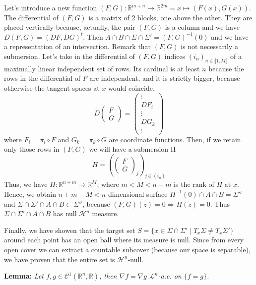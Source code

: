 \documentclass{article}
\begin{document}
\vspace{1ex}
Let's introduce a new function $(F, G):\mathbb R^{m+n}\rightarrow\mathbb R^{2m}
=x\mapsto (F(x),G(x))$. The differential of $(F,G)$ is a matrix of 2 blocks, one
above the other. They are placed vertically because, actually, the pair $(F,G)$ is
a column and we have $D(F,G)=(DF,DG)^t$. Then $A\cap B\cap\Sigma\cap\Sigma'=(F,G)
^{-1}(0)$ and we have a representation of an intersection. Remark
that $(F, G)$ is not necessarily a submersion. Let's take in the differential of $(F
,G)$ indices $(i_n)_{n\in\llbracket1,M\rrbracket}$ of a maximally linear
independent set of rows. Its cardinal is at least $n$ because the rows in the
differential of $F$ are independent, and it is strictly bigger, because otherwise
the tangent spaces at $x$ would coincide.
\[D\left(\begin{array}{cc} F\\ G\end{array}\right) =
    \left(\begin{array}{cc} \vdots \\DF_i\\ \vdots\\ DG_k\\ \vdots\end{array}\right)\]
where $F_i=\pi_i\circ F$ and $G_k=\pi_k\circ G$ are coordinate functions. Then,
if we retain only those rows in $(F,G)$ we will have a submersion H
\[H=\left(\left(\begin{array}{cc} F\\ G\end{array}\right)_j\right)_{j\in(i_n)}\]
Thus, we have $H:\mathbb R^{n+m}\rightarrow\mathbb R^{M}$, where $m<M<n+m$ is the
rank of $H$ at $x$. Hence, we obtain $n+m-M<n$ dimensional surface $H^{-1}(0)\cap
A\cap B=\Sigma''$ and $\Sigma\cap\Sigma'\cap A\cap B\subset\Sigma''$, because
$(F,G)(z)=0\Rightarrow H(z)=0$. Thus $\Sigma\cap\Sigma'\cap A\cap B$ has null
$\mathcal H^n$ measure.

\vspace{1ex}
Finally, we have showen that the target set $S=\{x\in\Sigma\cap\Sigma'\;|\;T_x\Sigma
\neq T_x\Sigma'\}$ around each point has an open ball where its measure is null.
Since from every open cover we can extract a countable subcover (because our
space is separable), we have proven that the entire set is $\mathcal H^n$-null.

\vspace{2ex}
\textbf{Lemma:} \textit{Let $f,g\in\mathcal C^1(\mathbb R^n, \mathbb R)$, then $\nabla f
=\nabla g$ $\mathcal L^n$-a.e. on $\{f=g\}$.}
\end{document}
